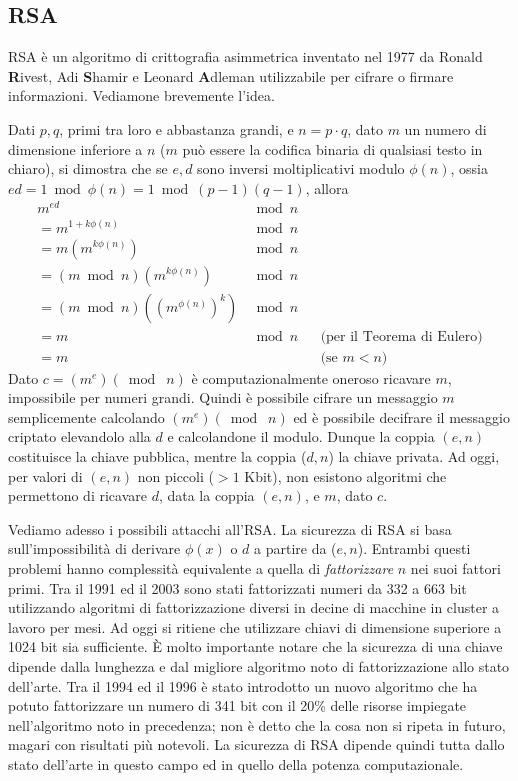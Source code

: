 \subsection{RSA}
RSA è un algoritmo di crittografia asimmetrica inventato nel 1977 da Ronald \textbf{R}ivest, Adi \textbf{S}hamir e Leonard \textbf{A}dleman utilizzabile per cifrare o firmare informazioni. Vediamone brevemente l'idea.

Dati $p, q$, primi tra loro e abbastanza grandi, e $n=p\cdot q$, dato $m$ un numero di dimensione inferiore a $n$ ($m$ può essere la codifica binaria di qualsiasi testo in chiaro), si dimostra che se $e, d$ sono inversi moltiplicativi modulo $\phi(n)$, ossia $ed=1\bmod\phi(n)=1\bmod(p-1)(q-1)$, allora
\begin{align*}
	m^{ed}&\bmod n && \\
	=m^{1+k\phi(n)}&\bmod n && \\
	=m(m^{k\phi(n)})&\bmod n && \\
	=(m\bmod n)(m^{k\phi(n)})&\bmod n && \\
	=(m\bmod n)((m^{\phi(n)})^k)&\bmod n && \\
	=m&\bmod n && \text{(per il Teorema di Eulero)}\\
	=m &&& \text{(se $m < n$)}
\end{align*}
Dato $c=(m^e) (\bmod\;n)$ è computazionalmente oneroso ricavare $m$, impossibile per numeri grandi. Quindi è possibile cifrare un messaggio $m$ semplicemente calcolando $(m^e)(\bmod\; n)$ ed è possibile decifrare il messaggio criptato elevandolo alla $d$ e calcolandone il modulo. Dunque la coppia $(e, n)$ costituisce la chiave pubblica, mentre la coppia ($d, n$) la chiave privata. Ad oggi, per valori di $(e, n)$ non piccoli ($> 1$ Kbit), non esistono algoritmi che permettono di ricavare $d$, data la coppia $(e, n)$, e $m$, dato $c$.

Vediamo adesso i possibili attacchi all'RSA. La sicurezza di RSA si basa sull'impossibilità di derivare $\phi(x)$ o $d$ a partire da ($e, n$). Entrambi questi problemi hanno complessità equivalente a quella di \textit{fattorizzare} $n$ nei suoi fattori primi. Tra il 1991 ed il 2003 sono stati fattorizzati numeri da 332 a 663 bit utilizzando algoritmi di fattorizzazione diversi in decine di macchine in cluster a lavoro per mesi. Ad oggi si ritiene che utilizzare chiavi di dimensione superiore a 1024 bit sia sufficiente. È molto importante notare che la sicurezza di una chiave dipende dalla lunghezza e dal migliore algoritmo noto di fattorizzazione allo stato dell'arte. Tra il 1994 ed il 1996 è stato introdotto un nuovo algoritmo che ha potuto fattorizzare un numero di 341 bit con il 20\% delle risorse impiegate nell'algoritmo noto in precedenza; non è detto che la cosa non si ripeta in futuro, magari con risultati più notevoli. La sicurezza di RSA dipende quindi tutta dallo stato dell'arte in questo campo ed in quello della potenza computazionale.

